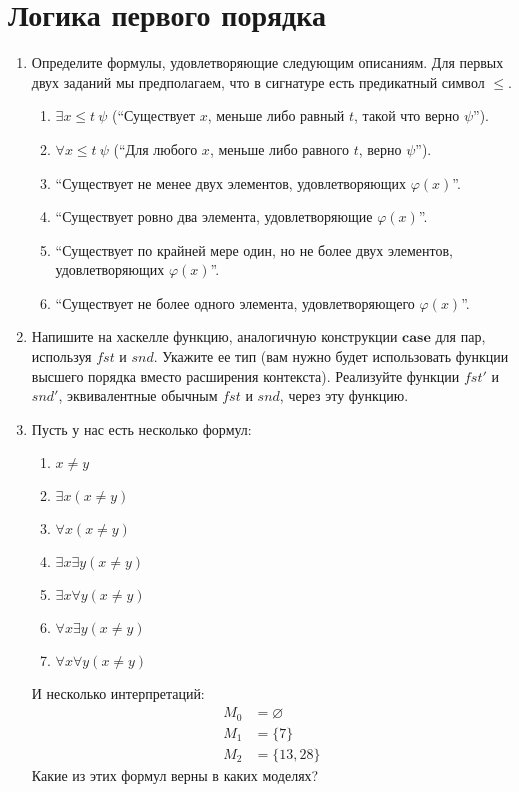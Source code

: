 \section*{Логика первого порядка}

\begin{enumerate}

\item Определите формулы, удовлетворяющие следующим описаниям.
    Для первых двух заданий мы предполагаем, что в сигнатуре есть предикатный символ $\leq$.
\begin{enumerate}
\item $\exists x \leq t\ \psi$ (``Существует $x$, меньше либо равный $t$, такой что верно $\psi$'').
\item $\forall x \leq t\ \psi$ (``Для любого $x$, меньше либо равного $t$, верно $\psi$'').
\item ``Существует не менее двух элементов, удовлетворяющих $\varphi(x)$''.
\item ``Существует ровно два элемента, удовлетворяющие $\varphi(x)$''.
\item ``Существует по крайней мере один, но не более двух элементов, удовлетворяющих $\varphi(x)$''.
\item ``Существует не более одного элемента, удовлетворяющего $\varphi(x)$''.
\end{enumerate}

\item Напишите на хаскелле функцию, аналогичную конструкции $\mathbf{case}$ для пар, используя $fst$ и $snd$.
    Укажите ее тип (вам нужно будет использовать функции высшего порядка вместо расширения контекста).
    Реализуйте функции $fst'$ и $snd'$, эквивалентные обычным $fst$ и $snd$, через эту функцию.

\item Пусть у нас есть несколько формул:
\begin{enumerate}
\item \label{it:no} $x \neq y$
\item \label{it:e} $\exists x (x \neq y)$
\item \label{it:a} $\forall x (x \neq y)$
\item \label{it:ee} $\exists x \exists y (x \neq y)$
\item \label{it:ea} $\exists x \forall y (x \neq y)$
\item \label{it:ae} $\forall x \exists y (x \neq y)$
\item \label{it:aa} $\forall x \forall y (x \neq y)$
\end{enumerate}
И несколько интерпретаций:
\begin{align*}
M_0 & = \varnothing \\
M_1 & = \{ 7 \} \\
M_2 & = \{ 13, 28 \}
\end{align*}
Какие из этих формул верны в каких моделях?


\end{enumerate}
